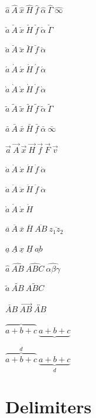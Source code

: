 \documentclass{article}
\begin{document}
$\hat{a}\ \hat{A}\ \hat{x}\ \hat{H}\ \hat{f}\ \hat{\alpha}\ \hat{\Gamma}\ \hat{\infty}$\par
$\check{a}\ \check{A}\ \check{x}\ \check{H}\ \check{f}\ \check{\alpha}\ \check{\Gamma}$\par
$\breve{a}\ \breve{A}\ \breve{x}\ \breve{H}\ \breve{f}\ \breve{\alpha}$\par
$\acute{a}\ \acute{A}\ \acute{x}\ \acute{H}\ \acute{f}\ \acute{\alpha}$\par
$\grave{a}\ \grave{A}\ \grave{x}\ \grave{H}\ \grave{f}\ \grave{\alpha}$\par
$\tilde{a}\ \tilde{A}\ \tilde{x}\ \tilde{H}\ \tilde{f}\ \tilde{\alpha}\ \tilde{\Gamma}$\par
$\bar{a}\ \bar{A}\ \bar{x}\ \bar{H}\ \bar{f}\ \bar{\alpha}\ \bar{\infty}$\par
$\vec{a}\ \vec{A}\ \vec{x}\ \vec{H}\ \vec{f}\ \vec{F}\ \vec{v}$\par
$\dot{a}\ \dot{A}\ \dot{x}\ \dot{H}\ \dot{f}\ \dot{\alpha}$\par
$\ddot{a}\ \ddot{A}\ \ddot{x}\ \ddot{H}\ \ddot{f}\ \ddot{\alpha}$\par
$\mathring{a}\ \mathring{A}\ \mathring{x}\ \mathring{H}$\par
$\overline{a}\ \overline{A}\ \overline{x}\ \overline{H}\ \overline{AB}\ \overline{z_{1}z_{2}}$\par
$\underline{a}\ \underline{A}\ \underline{x}\ \underline{H}\ \underline{ab}$\par
$\widehat{a}\ \widehat{AB}\ \widehat{ABC}\ \widehat{\alpha\beta\gamma}$\par
$\widetilde{a}\ \widetilde{AB}\ \widetilde{ABC}$\par
$\overleftarrow{AB}\ \overrightarrow{AB}\ \overleftrightarrow{AB}$\par
$\overbrace{a+b+c}\ \underbrace{a+b+c}$\par
$\overbrace{a+b+c}^{d}\ \underbrace{a+b+c}_{d}$\par

\section*{Delimiters}
\end{document}

